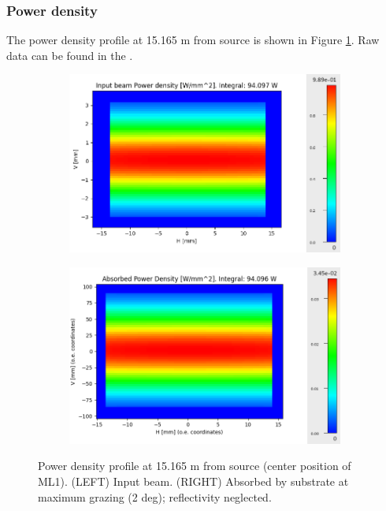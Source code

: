\subsubsection{Power density}
The power density profile at 15.165 m from source is shown in Figure \ref{fig:power_profile_ML1}. Raw data can be found in the \powerprofilesurl. \\
\begin{figure}[ht]  %
\begin{subfigure}{0.5\textwidth}
\includegraphics[width=\linewidth]{./../../power_profiles/power_profile_ML1.png}
\end{subfigure}
\hfill %
\begin{subfigure}{0.5\textwidth}
\includegraphics[width=\linewidth]{./../../power_profiles/power_profile_ML1_abs_2deg.png}
\end{subfigure}
\caption{\label{fig:power_profile_ML1} Power density profile at 15.165 m from source (center position of ML1). (LEFT) Input beam. (RIGHT) Absorbed by substrate at maximum grazing (2 deg); reflectivity neglected. }
\end{figure}


